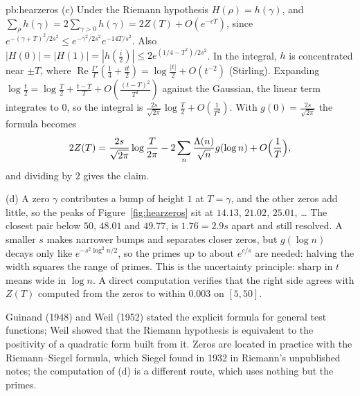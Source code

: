 \begin{solution}{pb:hearzeros}
(c) Under the Riemann hypothesis $H(\rho)=h(\gamma)$, and $\sum_\rho h(\gamma)=2\sum_{\gamma>0}h(\gamma)=2Z(T)+O(e^{-cT})$, since $e^{-(\gamma+T)^2/2s^2}\le e^{-\gamma^2/2s^2}e^{-14T/s^2}$.
Also $|H(0)|=|H(1)|=|h(\frac i2)|\le2e^{(1/4-T^2)/2s^2}$. In the integral, $h$ is concentrated near $\pm T$, where
$\operatorname{Re}\frac{\Gamma'}\Gamma(\frac14+\frac{it}2)=\log\frac{|t|}2+O(t^{-2})$ (Stirling). Expanding $\log\frac t2=\log\frac T2+\frac{t-T}T+O(\frac{(t-T)^2}{T^2})$ against the Gaussian,
the linear term integrates to $0$, so the integral is $\frac{2s}{\sqrt{2\pi}}\log\frac T2+O(\frac1{T^2})$. With $g(0)=\frac{2s}{\sqrt{2\pi}}$ the formula becomes
\[
2Z(T)=\frac{2s}{\sqrt{2\pi}}\log\frac T{2\pi}-2\sum_n\frac{\Lambda(n)}{\sqrt n}g(\log n)+O\Bigl(\frac1T\Bigr),
\]
and dividing by $2$ gives the claim.

(d) A zero $\gamma$ contributes a bump of height $1$ at $T=\gamma$, and the other zeros add little, so the peaks of Figure~\ref{fig:hearzeros} sit at $14.13$, $21.02$, $25.01$, \dots{}
The closest pair below $50$, $48.01$ and $49.77$, is $1.76=2.9s$ apart and still resolved. A smaller $s$ makes narrower bumps and separates closer zeros, but $g(\log n)$ decays only
like $e^{-s^2\log^2n/2}$, so the primes up to about $e^{c/s}$ are needed: halving the width squares the range of primes. This is the uncertainty principle: sharp in $t$ means wide
in $\log n$. A direct computation verifies that the right side agrees with $Z(T)$ computed from the zeros to within $0.003$ on $[5,50]$.


\leads Guinand (1948) and Weil (1952) stated the explicit formula for general test functions; Weil showed that the Riemann hypothesis is equivalent to the positivity of a
quadratic form built from it. Zeros are located in practice with the Riemann--Siegel formula, which Siegel found in 1932 in Riemann's unpublished notes; the computation
of (d) is a different route, which uses nothing but the primes.
\end{solution}

